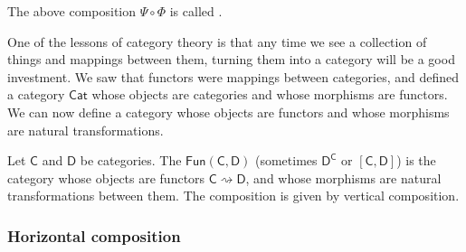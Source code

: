 \documentclass[main.tex]{subfiles}
\begin{document}
\begin{definition}
  \label{def:verticalcomposition}
  The above composition $\Psi \circ \Phi$ is called .
\end{definition}

One of the lessons of category theory is that any time we see a collection of things and mappings between them, turning them into a category will be a good investment. We saw that functors were mappings between categories, and defined a category $\mathsf{Cat}$ whose objects are categories and whose morphisms are functors. We can now define a category whose objects are functors and whose morphisms are natural transformations.

\begin{definition}
  \label{def:functorcategory}
  Let $\mathsf{C}$ and $\mathsf{D}$ be categories. The  $\mathsf{Fun}(\mathsf{C}, \mathsf{D})$ (sometimes $\mathsf{D}^{\mathsf{C}}$ or $[\mathsf{C},\mathsf{D}]$) is the category whose objects are functors $\mathsf{C} \rightsquigarrow \mathsf{D}$, and whose morphisms are natural transformations between them. The composition is given by vertical composition.
\end{definition}


\subsubsection{Horizontal composition}
\end{document}
